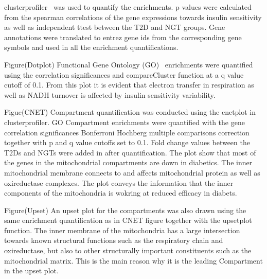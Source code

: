 %
%
%


clusterprofiler~\cite{CP} was used to quantify the enrichments. p values were calculated from the spearman correlations of the gene expressions towards insulin sensitivity as well as independent ttest between the T2D and NGT groups. Gene annotations were translated to entrez gene ids from the corresponding gene symbols and used in all the enrichment quantifications.

Figure(Dotplot) Functional Gene Ontology (GO)~\cite{GO} enrichments were quantified using the correlation significances and compareCluster function at a q value cutoff of 0.1. From this plot it is evident that electron transfer in respiration as well as NADH turnover is affected by insulin sensitivity variability.

Figue(CNET) Compartment quantification was conducted using the cnetplot in clusterprofiler. GO Compartment enrichments were quantified with the gene correlation significances Bonferroni Hochberg multiple comparisons correction together with p and q value cutoffs set to 0.1. Fold change values between the T2Ds and NGTs were added in after quantification. The plot show that most of the genes in the mitochondrial compartments are down in diabetics. The inner mitochondrial membrane connects to and affects mitochondrial protein as well as  oxireductase complexes. The plot conveys the information that the inner components of the mitochondria is wokring at reduced efficacy in diabets.

Figure(Upset) An upset plot for the compartments was also drawn using the same enrichment quantification as in CNET figure together with the upsetplot function. The inner membrane of the mitochondria has a large intersection towards known structural functions such as the respiratory chain and oxireductase, but also to other structurally important constituents such as the mitochondrial matrix. This is the main reason why it is the leading Compartment in the upset plot.
